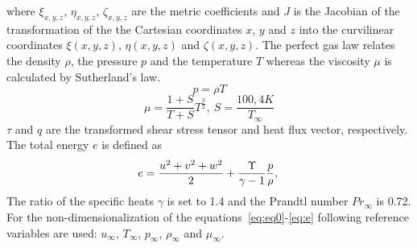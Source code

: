 \normalsize
where $\xi_{x,y,z}$, $\eta_{x,y,z}$, $\zeta_{x,y,z}$ are the metric coefficients and $J$ is the Jacobian of the transformation of the the Cartesian coordinates $x$, $y$ and $z$ into the curvilinear coordinates $\xi(x,y,z)$, $\eta(x,y,z)$ and $\zeta(x,y,z)$.
The perfect gas law relates the density $\rho$, the pressure $p$ and the temperature $T$ whereas the viscosity $\mu$ is calculated by Sutherland's law.
\begin{equation}
p=\rho T
\end{equation}
\begin{equation}
\mu=\frac{1+S}{T+S}T^\frac{3}{2},\ S=\frac{100,4K}{T_\infty}
\end{equation}
$\tau$ and $q$ are the transformed shear stress tensor and heat flux vector, respectively.
The total energy $e$ is defined as
\begin{equation}
\label{eq:e}
e=\frac{u^2+v^2+w^2}{2}+\frac{\Upsilon}{\gamma -1} \frac{p}{\rho},\\
\end{equation}
The ratio of the specific heats $\gamma$ is set to 1.4 and the Prandtl number $Pr_\infty$ is 0.72.
For the non-dimensionalization of the equations~\eqref{eq:eq0}-\eqref{eq:e} following reference variables are used: $u_\infty$, $T_\infty$, $p_\infty$,  $\rho_\infty$ and $\mu_\infty$.